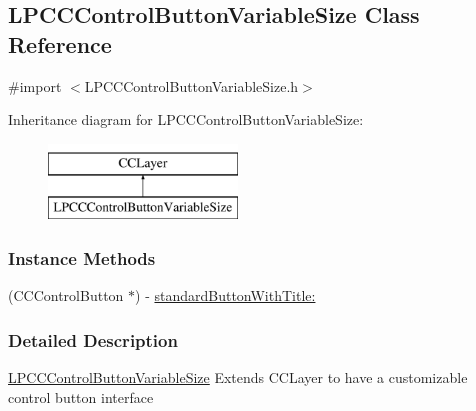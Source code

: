 \hypertarget{interface_l_p_c_c_control_button_variable_size}{\subsection{L\-P\-C\-C\-Control\-Button\-Variable\-Size Class Reference}
\label{d7/d50/interface_l_p_c_c_control_button_variable_size}
}


{\ttfamily \#import $<$L\-P\-C\-C\-Control\-Button\-Variable\-Size.\-h$>$}

Inheritance diagram for L\-P\-C\-C\-Control\-Button\-Variable\-Size\-:\begin{figure}[H]
\begin{center}
\leavevmode
\includegraphics[height=2.000000cm]{d7/d50/interface_l_p_c_c_control_button_variable_size}
\end{center}
\end{figure}
\subsubsection*{Instance Methods}
\begin{DoxyCompactItemize}
\item 
(C\-C\-Control\-Button $\ast$) -\/ \hyperlink{interface_l_p_c_c_control_button_variable_size_acd2df17edaf3d7dbd80e283a7ee35c52}{standard\-Button\-With\-Title\-:}
\end{DoxyCompactItemize}


\subsubsection{Detailed Description}
\hyperlink{interface_l_p_c_c_control_button_variable_size}{L\-P\-C\-C\-Control\-Button\-Variable\-Size} Extends C\-C\-Layer to have a customizable control button interface 

